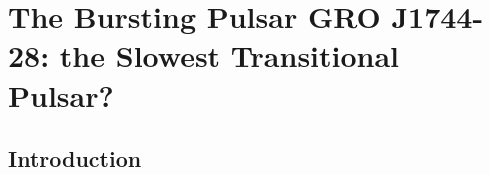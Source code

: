 %
%
%

%


\chapter{The Bursting Pulsar GRO J1744-28: the Slowest Transitional Pulsar?}




\section{Introduction}

